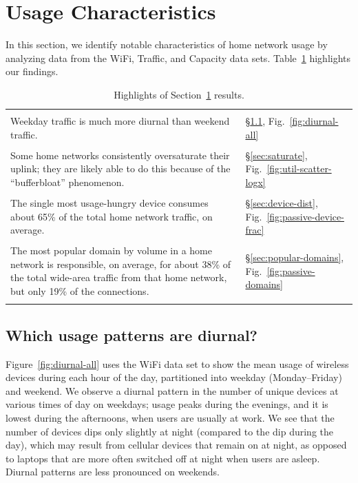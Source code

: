 \section{Usage Characteristics}\label{sec:usage}

In this section, we identify notable characteristics of home network usage by
analyzing data from the WiFi, Traffic, and Capacity data sets.
Table~\ref{tab:usage-results} highlights our findings.

\begin{table}[t!]
\begin{small}
\begin{tabular}{|p{2.6in}l|}
\hline
& \\
Weekday traffic is much more diurnal than weekend traffic. &
\S\ref{sec:diurnal}, Fig.~\ref{fig:diurnal-all} \\ & \\
%
Some home networks consistently oversaturate their uplink; they are
likely able to do this because of the ``bufferbloat'' phenomenon. &
\S\ref{sec:saturate}, Fig.~\ref{fig:util-scatter-logx} \\ & \\
%
The single most usage-hungry device consumes about 65\% of the total
home network traffic, on average.  &
\S\ref{sec:device-dist}, Fig.~\ref{fig:passive-device-frac} \\ & \\
%
The most popular domain by volume in a
home network is responsible, on average, for about 38\% of the total wide-area
traffic from that home network, but only 19\% of the connections. &
\S\ref{sec:popular-domains}, Fig.~\ref{fig:passive-domains} \\ & \\
%

\hline
\end{tabular}
\end{small}
\caption{Highlights of Section~\ref{sec:usage} results.}
\label{tab:usage-results}
\end{table}

\subsection{Which usage patterns are diurnal?}\label{sec:diurnal}
Figure~\ref{fig:diurnal-all} uses the WiFi data set to show the mean usage of wireless devices during
each hour of the day, partitioned into weekday (Monday--Friday) and weekend. We
observe a diurnal pattern in the number of unique devices at various times of
day on weekdays; usage peaks during the evenings, and it is lowest during the
afternoons, when users are usually at work.
We see that the number of devices dips only slightly at night
(compared to the dip during the day), which may result from cellular
devices that remain on at night, as opposed to laptops that are more often
switched off at night when users are asleep. Diurnal patterns are less pronounced on weekends.

